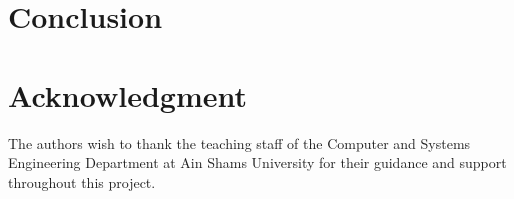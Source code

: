 \documentclass[conference]{IEEEtran}
\begin{document}
\section{Conclusion}


\section*{Acknowledgment}
The authors wish to thank the teaching staff of the Computer and Systems Engineering Department at Ain Shams University for their guidance and support throughout this project.




\end{document}
